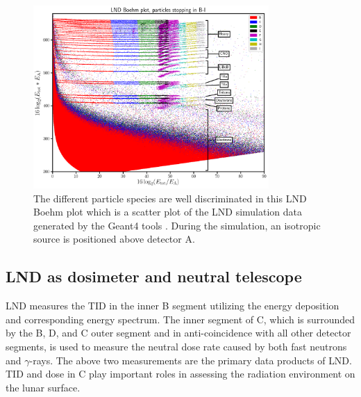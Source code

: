 \begin{figure}
    \centering
    \includegraphics[width=0.8\textwidth]{images/LND_Boehm_plot_isotropic_on_top_of_A_annotated.png}
    \caption[LND Boehm plot of stopping particles based on the simulated data]{The different particle species are well discriminated in this LND Boehm plot which is a scatter plot of the \ac{LND} simulation data generated by the \ac{Geant4} tools \citep{Agostinelli-2003}. During the simulation, an isotropic source is positioned above detector A.}
    \label{Fig:LND-Boehm-plot}
\end{figure}


\subsection*{LND as dosimeter and neutral telescope}

\ac{LND} measures the \ac{TID} in the inner B segment utilizing the energy deposition and corresponding energy spectrum. The inner segment of C, which is surrounded by the B, D, and C outer segment and in anti-coincidence with all other detector segments, is used to measure the neutral dose rate caused by both fast neutrons and $\gamma$-rays. The above two measurements are the primary data products of \ac{LND}. \ac{TID} and dose in C play important roles in assessing the radiation environment on the lunar surface. 


